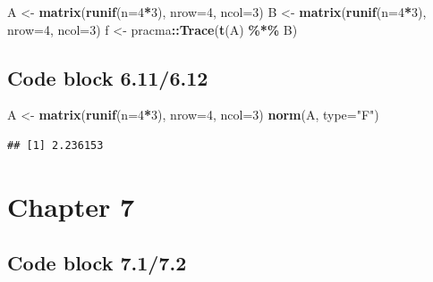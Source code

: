 \documentclass[
]{book}
\newenvironment{Shaded}{\begin{snugshade}}{\end{snugshade}}
\newcommand{\DataTypeTok}[1]{\textcolor[rgb]{0.13,0.29,0.53}{#1}}
\newcommand{\DecValTok}[1]{\textcolor[rgb]{0.00,0.00,0.81}{#1}}
\newcommand{\KeywordTok}[1]{\textcolor[rgb]{0.13,0.29,0.53}{\textbf{#1}}}
\newcommand{\NormalTok}[1]{#1}
\newcommand{\OperatorTok}[1]{\textcolor[rgb]{0.81,0.36,0.00}{\textbf{#1}}}
\newcommand{\StringTok}[1]{\textcolor[rgb]{0.31,0.60,0.02}{#1}}
\begin{document}
\begin{Shaded}
\begin{Highlighting}[]
\NormalTok{A \textless{}{-}}\StringTok{ }\KeywordTok{matrix}\NormalTok{(}\KeywordTok{runif}\NormalTok{(}\DataTypeTok{n=}\DecValTok{4}\OperatorTok{*}\DecValTok{3}\NormalTok{), }\DataTypeTok{nrow=}\DecValTok{4}\NormalTok{, }\DataTypeTok{ncol=}\DecValTok{3}\NormalTok{)}
\NormalTok{B \textless{}{-}}\StringTok{ }\KeywordTok{matrix}\NormalTok{(}\KeywordTok{runif}\NormalTok{(}\DataTypeTok{n=}\DecValTok{4}\OperatorTok{*}\DecValTok{3}\NormalTok{), }\DataTypeTok{nrow=}\DecValTok{4}\NormalTok{, }\DataTypeTok{ncol=}\DecValTok{3}\NormalTok{)}
\NormalTok{f \textless{}{-}}\StringTok{ }\NormalTok{pracma}\OperatorTok{::}\KeywordTok{Trace}\NormalTok{(}\KeywordTok{t}\NormalTok{(A) }\OperatorTok{\%*\%}\StringTok{ }\NormalTok{B)}
\end{Highlighting}
\end{Shaded}

\hypertarget{code-block-6.116.12}{%
\subsection*{Code block 6.11/6.12}\label{code-block-6.116.12}}

\begin{Shaded}
\begin{Highlighting}[]
\NormalTok{A \textless{}{-}}\StringTok{ }\KeywordTok{matrix}\NormalTok{(}\KeywordTok{runif}\NormalTok{(}\DataTypeTok{n=}\DecValTok{4}\OperatorTok{*}\DecValTok{3}\NormalTok{), }\DataTypeTok{nrow=}\DecValTok{4}\NormalTok{, }\DataTypeTok{ncol=}\DecValTok{3}\NormalTok{)}
\KeywordTok{norm}\NormalTok{(A, }\DataTypeTok{type=}\StringTok{"F"}\NormalTok{)}
\end{Highlighting}
\end{Shaded}

\begin{verbatim}
## [1] 2.236153
\end{verbatim}

\hypertarget{chapter-7}{%
\section*{Chapter 7}\label{chapter-7}}

\hypertarget{code-block-7.17.2}{%
\subsection*{Code block 7.1/7.2}\label{code-block-7.17.2}}
\end{document}

